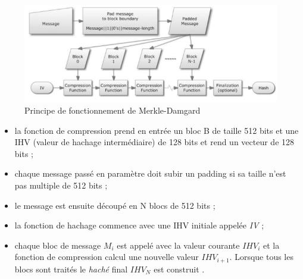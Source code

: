 \begin{figure}[h!]
  \includegraphics[scale=.61]{./images/md.png}
  \caption{Principe de fonctionnement de Merkle-Damgard}
\end{figure}

\vspace{.5cm}

\begin{itemize}
\item la fonction de compression prend en entrée un bloc B de taille 512 bits et une IHV (valeur de hachage intermédiaire) de 128 bits et rend un vecteur de 128 bits ;
\item chaque message passé en paramètre doit subir un padding si sa taille n'est pas multiple de 512 bits ;
\item le message est ensuite découpé en N blocs de 512 bits ;
\item la fonction de hachage commence avec une IHV initiale appelée {\it{IV}} ;
\item chaque bloc de message $M_{i}$ est appelé avec la valeur courante $IHV_{i}$ et la fonction de compression calcul une nouvelle valeur $IHV_{i+1}$. Lorsque tous les blocs sont traités le {\it{haché}} final $IHV_{N}$ est construit .
\end{itemize}
\vspace{.5cm}

